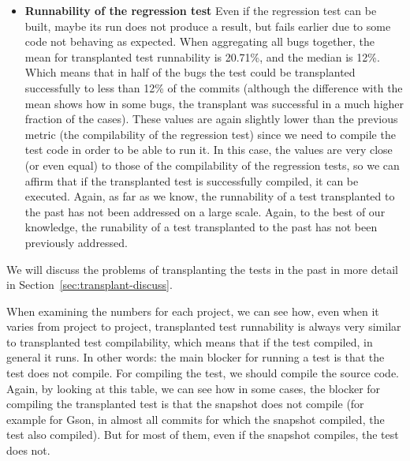 \begin{itemize}
\item \textbf{Runnability of the regression test} Even if the regression test can be built, maybe its run does not produce a result, but fails earlier due to some code not behaving as expected. 
When aggregating all bugs together, the mean for transplanted test runnability is 20.71\%, and the median is 12\%. 
Which means that in half of the bugs the test could be transplanted successfully to less than 12\% of the commits (although the difference with the mean shows how in some bugs, the transplant was successful in a much higher fraction of the cases). 
These values are again slightly lower than the previous metric (the compilability of the regression test) since we need to compile the test code in order to be able to run it. In this case, the values are very close (or even equal) to those of the compilability of the regression tests, so we can affirm that if the transplanted test is successfully compiled, it can be executed.
Again, as far as we know, the runnability of a test transplanted to the past has not been addressed on a large scale.
Again, to the best of our knowledge, the runability of a test transplanted to the past has not been previously addressed.
\end{itemize}

We will discuss the problems of transplanting the tests in the past in more detail in Section~\ref{sec:transplant-discuss}.

When examining the numbers for each project, we can see how, even when it varies from project to project, transplanted test runnability is always very similar to transplanted test compilability, which means that if the test compiled, in general it runs. In other words: the main blocker for running a test is that the test does not compile. For compiling the test, we should compile the source code. Again, by looking at this table, we can see how in some cases, the blocker for compiling the transplanted test is that the snapshot does not compile (for example for Gson, in almost all commits for which the snapshot compiled, the test also compiled). But for most of them, even if the snapshot compiles, the test does not.

